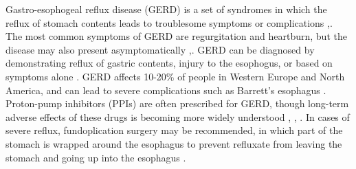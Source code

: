 \documentclass[12pt]{article}
\begin{document}
Gastro-esophogeal reflux disease (GERD) is a set of syndromes in which 
the reflux of stomach contents leads to troublesome symptoms or 
complications \cite{vakil-gerd_defn-2006},\cite{dent-gerd_epi-2005}. The most common symptoms of GERD 
are regurgitation and heartburn, but the disease may also present 
asymptomatically \cite{vakil-gerd_defn-2006},\cite{dent-gerd_epi-2005}. 
GERD can be diagnosed by demonstrating reflux of gastric contents, injury to the esophogus, 
or based on symptoms alone \cite{vakil-gerd_defn-2006}. GERD affects
10-20\% of people in Western Europe and North America, and can lead to severe complications such as Barrett's 
esophagus \cite{vakil-gerd_defn-2006}. Proton-pump inhibitors (PPIs) are often prescribed for GERD,
though long-term adverse effects of these drugs is becoming more widely understood \cite{sweet-gerd_asp-2009}, \cite{imhann-ppi-2016}, \cite{houghton-microaspiration-2016}.
In cases of severe reflux, fundoplication surgery may
be recommended, in which part of the stomach is wrapped around the 
esophagus to prevent refluxate from leaving the stomach and going up
into the esophagus \cite{sweet-gerd_asp-2009}. 
\end{document}
